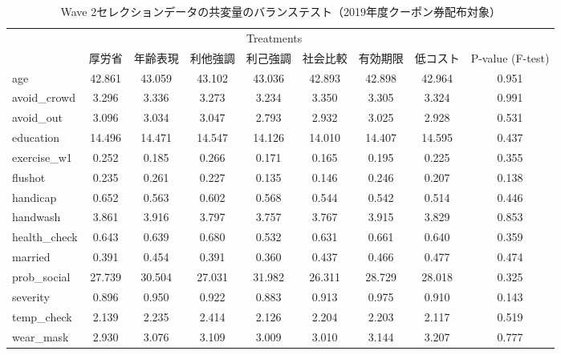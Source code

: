 \documentclass[
  11pt,
  a4paper,
]{article}
\begin{document}
\begin{table}

\caption{\label{tab:BalanceWave2Coupon1}Wave 2セレクションデータの共変量のバランステスト（2019年度クーポン券配布対象）}
\centering
\fontsize{9}{11}\selectfont
\begin{tabular}[t]{lcccccccc}
\toprule
\multicolumn{1}{c}{ } & \multicolumn{7}{c}{Treatments} & \multicolumn{1}{c}{ } \\
\cmidrule(l{3pt}r{3pt}){2-8}
  & 厚労省 & 年齢表現 & 利他強調 & 利己強調 & 社会比較 & 有効期限 & 低コスト & P-value (F-test)\\
\midrule
age & 42.861 & 43.059 & 43.102 & 43.036 & 42.893 & 42.898 & 42.964 & 0.951\\
avoid\_crowd & 3.296 & 3.336 & 3.273 & 3.234 & 3.350 & 3.305 & 3.324 & 0.991\\
avoid\_out & 3.096 & 3.034 & 3.047 & 2.793 & 2.932 & 3.025 & 2.928 & 0.531\\
education & 14.496 & 14.471 & 14.547 & 14.126 & 14.010 & 14.407 & 14.595 & 0.437\\
exercise\_w1 & 0.252 & 0.185 & 0.266 & 0.171 & 0.165 & 0.195 & 0.225 & 0.355\\
flushot & 0.235 & 0.261 & 0.227 & 0.135 & 0.146 & 0.246 & 0.207 & 0.138\\
handicap & 0.652 & 0.563 & 0.602 & 0.568 & 0.544 & 0.542 & 0.514 & 0.446\\
handwash & 3.861 & 3.916 & 3.797 & 3.757 & 3.767 & 3.915 & 3.829 & 0.853\\
health\_check & 0.643 & 0.639 & 0.680 & 0.532 & 0.631 & 0.661 & 0.640 & 0.359\\
married & 0.391 & 0.454 & 0.391 & 0.360 & 0.437 & 0.466 & 0.477 & 0.474\\
prob\_social & 27.739 & 30.504 & 27.031 & 31.982 & 26.311 & 28.729 & 28.018 & 0.325\\
severity & 0.896 & 0.950 & 0.922 & 0.883 & 0.913 & 0.975 & 0.910 & 0.143\\
temp\_check & 2.139 & 2.235 & 2.414 & 2.126 & 2.204 & 2.203 & 2.117 & 0.519\\
wear\_mask & 2.930 & 3.076 & 3.109 & 3.009 & 3.010 & 3.144 & 3.207 & 0.777\\
\bottomrule
\end{tabular}
\end{table}
\end{document}
